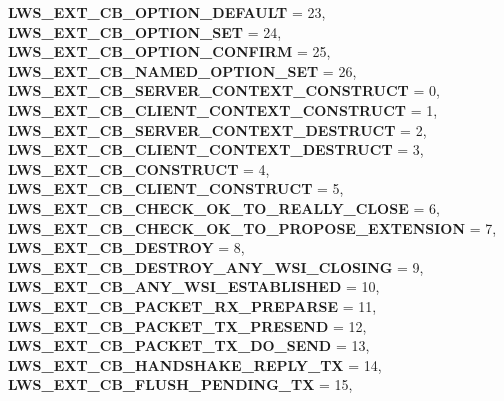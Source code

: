 \begin{DoxyCompactItemize}
\newline
{\bfseries L\+W\+S\+\_\+\+E\+X\+T\+\_\+\+C\+B\+\_\+\+O\+P\+T\+I\+O\+N\+\_\+\+D\+E\+F\+A\+U\+LT} = 23, 
{\bfseries L\+W\+S\+\_\+\+E\+X\+T\+\_\+\+C\+B\+\_\+\+O\+P\+T\+I\+O\+N\+\_\+\+S\+ET} = 24, 
{\bfseries L\+W\+S\+\_\+\+E\+X\+T\+\_\+\+C\+B\+\_\+\+O\+P\+T\+I\+O\+N\+\_\+\+C\+O\+N\+F\+I\+RM} = 25, 
{\bfseries L\+W\+S\+\_\+\+E\+X\+T\+\_\+\+C\+B\+\_\+\+N\+A\+M\+E\+D\+\_\+\+O\+P\+T\+I\+O\+N\+\_\+\+S\+ET} = 26, 
\newline
{\bfseries L\+W\+S\+\_\+\+E\+X\+T\+\_\+\+C\+B\+\_\+\+S\+E\+R\+V\+E\+R\+\_\+\+C\+O\+N\+T\+E\+X\+T\+\_\+\+C\+O\+N\+S\+T\+R\+U\+CT} = 0, 
{\bfseries L\+W\+S\+\_\+\+E\+X\+T\+\_\+\+C\+B\+\_\+\+C\+L\+I\+E\+N\+T\+\_\+\+C\+O\+N\+T\+E\+X\+T\+\_\+\+C\+O\+N\+S\+T\+R\+U\+CT} = 1, 
{\bfseries L\+W\+S\+\_\+\+E\+X\+T\+\_\+\+C\+B\+\_\+\+S\+E\+R\+V\+E\+R\+\_\+\+C\+O\+N\+T\+E\+X\+T\+\_\+\+D\+E\+S\+T\+R\+U\+CT} = 2, 
{\bfseries L\+W\+S\+\_\+\+E\+X\+T\+\_\+\+C\+B\+\_\+\+C\+L\+I\+E\+N\+T\+\_\+\+C\+O\+N\+T\+E\+X\+T\+\_\+\+D\+E\+S\+T\+R\+U\+CT} = 3, 
\newline
{\bfseries L\+W\+S\+\_\+\+E\+X\+T\+\_\+\+C\+B\+\_\+\+C\+O\+N\+S\+T\+R\+U\+CT} = 4, 
{\bfseries L\+W\+S\+\_\+\+E\+X\+T\+\_\+\+C\+B\+\_\+\+C\+L\+I\+E\+N\+T\+\_\+\+C\+O\+N\+S\+T\+R\+U\+CT} = 5, 
{\bfseries L\+W\+S\+\_\+\+E\+X\+T\+\_\+\+C\+B\+\_\+\+C\+H\+E\+C\+K\+\_\+\+O\+K\+\_\+\+T\+O\+\_\+\+R\+E\+A\+L\+L\+Y\+\_\+\+C\+L\+O\+SE} = 6, 
{\bfseries L\+W\+S\+\_\+\+E\+X\+T\+\_\+\+C\+B\+\_\+\+C\+H\+E\+C\+K\+\_\+\+O\+K\+\_\+\+T\+O\+\_\+\+P\+R\+O\+P\+O\+S\+E\+\_\+\+E\+X\+T\+E\+N\+S\+I\+ON} = 7, 
\newline
{\bfseries L\+W\+S\+\_\+\+E\+X\+T\+\_\+\+C\+B\+\_\+\+D\+E\+S\+T\+R\+OY} = 8, 
{\bfseries L\+W\+S\+\_\+\+E\+X\+T\+\_\+\+C\+B\+\_\+\+D\+E\+S\+T\+R\+O\+Y\+\_\+\+A\+N\+Y\+\_\+\+W\+S\+I\+\_\+\+C\+L\+O\+S\+I\+NG} = 9, 
{\bfseries L\+W\+S\+\_\+\+E\+X\+T\+\_\+\+C\+B\+\_\+\+A\+N\+Y\+\_\+\+W\+S\+I\+\_\+\+E\+S\+T\+A\+B\+L\+I\+S\+H\+ED} = 10, 
{\bfseries L\+W\+S\+\_\+\+E\+X\+T\+\_\+\+C\+B\+\_\+\+P\+A\+C\+K\+E\+T\+\_\+\+R\+X\+\_\+\+P\+R\+E\+P\+A\+R\+SE} = 11, 
\newline
{\bfseries L\+W\+S\+\_\+\+E\+X\+T\+\_\+\+C\+B\+\_\+\+P\+A\+C\+K\+E\+T\+\_\+\+T\+X\+\_\+\+P\+R\+E\+S\+E\+ND} = 12, 
{\bfseries L\+W\+S\+\_\+\+E\+X\+T\+\_\+\+C\+B\+\_\+\+P\+A\+C\+K\+E\+T\+\_\+\+T\+X\+\_\+\+D\+O\+\_\+\+S\+E\+ND} = 13, 
{\bfseries L\+W\+S\+\_\+\+E\+X\+T\+\_\+\+C\+B\+\_\+\+H\+A\+N\+D\+S\+H\+A\+K\+E\+\_\+\+R\+E\+P\+L\+Y\+\_\+\+TX} = 14, 
{\bfseries L\+W\+S\+\_\+\+E\+X\+T\+\_\+\+C\+B\+\_\+\+F\+L\+U\+S\+H\+\_\+\+P\+E\+N\+D\+I\+N\+G\+\_\+\+TX} = 15, 
\newline

\end{DoxyCompactItemize}
